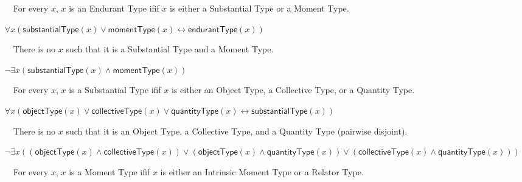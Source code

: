 \documentclass{article}
\newcommand{\AxLabel}{a}
\newcounter{cntax}
\newcommand{\myax}[1]{\refstepcounter{cntax}{\bf \small \AxLabel\thecntax}\label{#1}$\,\,\,\,$}
\newcommand{\me}[1]{\textsf{#1}}
\begin{document}
\begin{itemize}
    \item[\myax{ax_endurantType_taxonomy_nature}] For every $x$, $x$ is an \me{Endurant Type} ifif $x$ is either a \me{Substantial Type} or a \me{Moment Type}.
    
    $\forall x(\textsf{substantialType}(x)\vee \textsf{momentType}(x)\leftrightarrow \textsf{endurantType}(x))$
    
    
    
    \item[\myax{ax_endurantType_partition_nature}] There is no $x$ such that it is a \me{Substantial Type} and a \me{Moment Type}.
    
    $\neg \exists x(\textsf{substantialType}(x)\wedge \textsf{momentType}(x))$
    
    

    \item[\myax{ax_substantialType_taxonomy}] For every $x$, $x$ is a \me{Substantial Type} ifif $x$ is either an \me{Object Type}, a \me{Collective Type}, or a \me{Quantity Type}.
    
    $\forall x(\textsf{objectType}(x)\vee \textsf{collectiveType}(x)\vee \textsf{quantityType}(x)\leftrightarrow \textsf{substantialType}(x))$
    
    
    
    \item[\myax{ax_substantialType_partition}] There is no $x$ such that it is an \me{Object Type}, a \me{Collective Type}, and a \me{Quantity Type} (pairwise disjoint).
    
    $\neg \exists x((\textsf{objectType}(x)\wedge \textsf{collectiveType}(x))\vee (\textsf{objectType}(x)\wedge \textsf{quantityType}(x))\vee (\textsf{collectiveType}(x)\wedge \textsf{quantityType}(x)))$
    
    

    \item[\myax{ax_momentType_taxonomy}] For every $x$, $x$ is a \me{Moment Type} ifif $x$ is either an \me{Intrinsic Moment Type} or a \me{Relator Type}.
    

\end{itemize}
\end{document}
